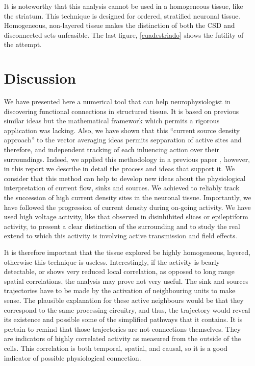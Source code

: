 \documentclass[letterpaper,12pts]{article}
\begin{document}
  It is noteworthy that this analysis cannot be used in a homogeneous tissue, like the striatum. This technique is designed for ordered, stratified neuronal tissue. Homogeneous, non-layered tissue makes the distinction of both the CSD and disconnected sets unfeasible. The last figure, \ref{cuadestriado} shows the futility of the attempt.






\section{Discussion}

We have presented here a numerical tool that can help neurophysiologist in
discovering functional connections in structured tissue.
It is based on previous similar ideas \cite{Chao05, Chao07, Manjarrez09}
  but the mathematical framework
which permits a rigorous application was lacking. Also, we have
shown that this ``current source density approach'' to the vector
averaging ideas permits sepparation of active sites and therefore,
and independent tracking of each inluencing action over
their surroundings. Indeed, we applied this methodology in a previous paper \cite{Franco2018}, however, in this report we describe in detail the process and ideas that support it. We consider that this method can help to develop new ideas about the physiological interpretation of current flow, sinks and sources. We achieved to reliably track the succession of high current density sites in the neuronal tissue. Importantly, we have followed the progression of current density during on-going activity. We have used high voltage activity, like that observed in disinhibited slices or epileptiform activity, to present a clear distinction of the surrounding and to study the real extend to which this activity is involving active transmission and field effects.

It is therefore important that the tissue explored be highly homogeneous, layered, otherwise this technique is useless. Interestingly, if the activity is bearly detectable, or shows very reduced local correlation, as opposed to long range spatial correlations, the analysis may prove not very useful. The sink and sources trajectories have to be made by the activation of neighbouring units to make sense. The plausible explanation for these active neighbours would be that they correspond to the same processing circuitry, and thus, the trajectory would reveal its existence and possible some of the simplified pathways that it contains.  It is pertain to remind that those trajectories are not connections themselves. They are indicators of highly correlated activity as measured from the outside of the cells. This correlation is both temporal, spatial, and causal, so it is a good indicator of possible physiological connection.
\end{document}
